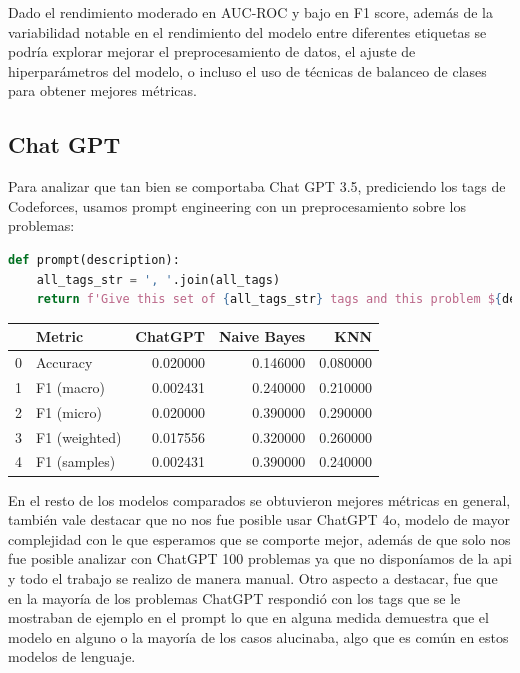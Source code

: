 \documentclass{article}
\begin{document}
    Dado el rendimiento moderado en AUC-ROC y bajo en F1 score, además de la variabilidad notable en 
    el rendimiento del modelo entre diferentes etiquetas se podría explorar mejorar el 
    preprocesamiento de datos, el ajuste de hiperparámetros del modelo, o incluso el uso de técnicas 
    de balanceo de clases para obtener mejores métricas.


\subsection{Chat GPT}

Para analizar que tan bien se comportaba Chat GPT 3.5, prediciendo los tags de Codeforces, usamos prompt engineering
con un preprocesamiento sobre los problemas:

\begin{lstlisting}[language=Python, caption=Prompt para tagear los problemas]
def prompt(description):
    all_tags_str = ', '.join(all_tags)
    return f'Give this set of {all_tags_str} tags and this problem ${description}, give me the set of problem tags in the following format: greedy, implementation, dp'
\end{lstlisting}

\begin{tabular}{|l|l|r|r|r|}
    \toprule
    {} & Metric        & ChatGPT  & Naive Bayes & KNN      \\
    \midrule
    0  & Accuracy      & 0.020000 & 0.146000    & 0.080000 \\
    1  & F1 (macro)    & 0.002431 & 0.240000    & 0.210000 \\
    2  & F1 (micro)    & 0.020000 & 0.390000    & 0.290000 \\
    3  & F1 (weighted) & 0.017556 & 0.320000    & 0.260000 \\
    4  & F1 (samples)  & 0.002431 & 0.390000    & 0.240000 \\
    \bottomrule
\end{tabular}

En el resto de los modelos comparados se obtuvieron mejores métricas en general, también vale destacar que no nos fue posible
usar ChatGPT 4o, modelo de mayor complejidad con le que esperamos que se comporte mejor, además de que solo nos fue posible 
analizar con ChatGPT 100 problemas ya que no disponíamos de la api y todo el trabajo se realizo de manera manual. Otro aspecto
a destacar, fue que en la mayoría de los problemas ChatGPT respondió  con los tags que se le mostraban de ejemplo en el prompt
lo que en alguna medida demuestra que el modelo en alguno o la mayoría de los casos alucinaba, algo que es común en estos modelos 
de lenguaje.
\end{document}
